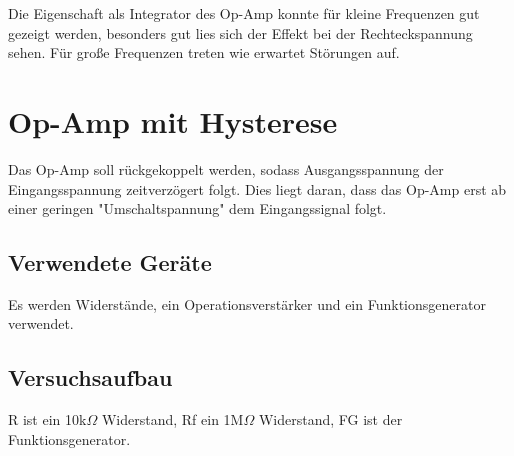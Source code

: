 \documentclass[12pt,a4paper]{article}
\begin{document}
Die Eigenschaft als Integrator des Op-Amp konnte für kleine Frequenzen gut gezeigt werden, besonders gut lies sich der Effekt bei der Rechteckspannung sehen. Für große Frequenzen treten wie erwartet Störungen auf.

\section{Op-Amp mit Hysterese}
Das Op-Amp soll rückgekoppelt werden, sodass Ausgangsspannung der Eingangsspannung zeitverzögert folgt. Dies liegt daran, dass das Op-Amp erst ab einer geringen "Umschaltspannung" dem Eingangssignal folgt.
\subsection{Verwendete Geräte}

Es werden Widerstände, ein Operationsverstärker und ein Funktionsgenerator verwendet.

\subsection{Versuchsaufbau}

R ist ein 10k$\Omega$ Widerstand, Rf ein 1M$\Omega$ Widerstand, FG ist der Funktionsgenerator.
\end{document}
